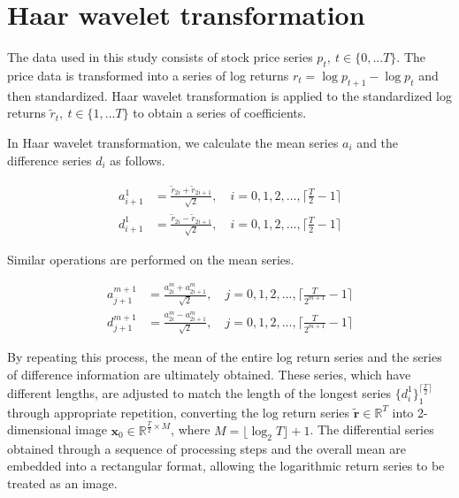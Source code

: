 \documentclass{article}
\begin{document}
\section{Haar wavelet transformation}

The data used in this study consists of stock price series $p_t,~t\in\{0,...T\}$. The price data is transformed into a series of log returns $r_t=\log p_{t+1} - \log p_{t}$ and then standardized. Haar wavelet transformation is applied to the standardized log returns $\tilde{r}_t,~t\in\{1,...T\}$ to obtain a series of coefficients.

In Haar wavelet transformation, we calculate the mean series $a_i$ and the difference series $d_i$ as follows. 

\begin{equation}
  \begin{split}
      a_{i+1}^{1} &= \frac{\tilde{r}_{2i} + \tilde{r}_{2i+1}}{\sqrt{2}}, \quad i = 0, 1, 2, \ldots, \bigg\lceil \frac{T}{2}-1 \bigg\rceil \\
      d_{i+1}^{1} &= \frac{\tilde{r}_{2i} - \tilde{r}_{2i+1}}{\sqrt{2}}, \quad i = 0, 1, 2, \ldots, \bigg\lceil \frac{T}{2}-1 \bigg\rceil
  \end{split}
\end{equation}

Similar operations are performed on the mean series. 

\begin{equation}
  \begin{split}
      a_{j+1}^{m+1} &= \frac{a^{m}_{2i} + a^{m}_{2i+1}}{\sqrt{2}}, \quad j = 0, 1, 2, \ldots, \bigg\lceil \frac{T}{2^{m+1}}-1 \bigg\rceil \\
      d_{j+1}^{m+1} &= \frac{a^{m}_{2i} - a^{m}_{2i+1}}{\sqrt{2}}, \quad j = 0, 1, 2, \ldots, \bigg\lceil \frac{T}{2^{m+1}}-1 \bigg\rceil
  \end{split}
\end{equation}

By repeating this process, the mean of the entire log return series and the series of difference information are ultimately obtained. These series, which have different lengths, are adjusted to match the length of the longest series $\{ d^{1}_i \}_{1}^{\big\lceil\frac{T}{2}\big\rceil}$ through appropriate repetition, converting the log return series $\bm{\tilde{r}}\in \mathbb{R}^{T}$ into 2-dimensional image $\bm{x}_0 \in \mathbb{R}^{\frac{T}{2} \times M}$, where $M = \lfloor \log_2 T \rfloor + 1$. 
The differential series obtained through a sequence of processing steps and the overall mean are embedded into a rectangular format, allowing the logarithmic return series to be treated as an image.
\end{document}
